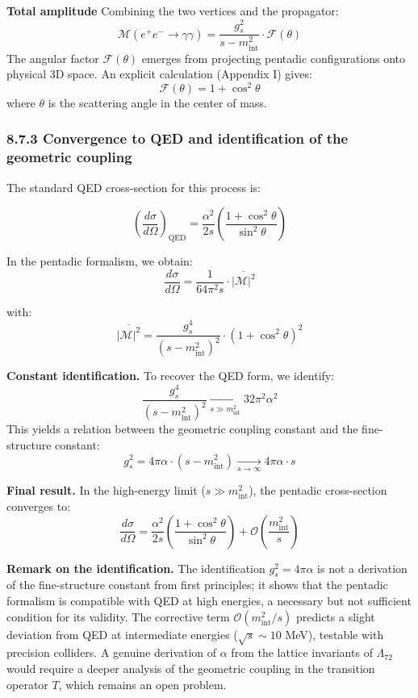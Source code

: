 \documentclass[11pt]{article}
\let\oldmathcal\mathcal
\renewcommand{\mathcal}[1]{\oldmathcal{#1}}
\begin{document}
\textbf{Total amplitude} Combining the two vertices and the propagator:
\[
\mathcal{M}(e^+ e^- \to \gamma\gamma) = \frac{g_s^2}{s - m_{\text{int}}^2} \cdot \mathcal{F}(\theta)
\] The angular factor \(\mathcal{F}(\theta)\) emerges from projecting
pentadic configurations onto physical 3D space. An explicit calculation
(Appendix I) gives: \[
\mathcal{F}(\theta) = 1 + \cos^2\theta
\] where \(\theta\) is the scattering angle in the center of mass.

\hypertarget{convergence-to-qed-and-identification-of-the-geometric-coupling}{%
\subsubsection{8.7.3 Convergence to QED and identification of the
geometric
coupling}\label{convergence-to-qed-and-identification-of-the-geometric-coupling}}

The standard QED cross-section for this process is:

\[
\left(\frac{d\sigma}{d\Omega}\right)_{\text{QED}} = \frac{\alpha^2}{2s} \left(\frac{1 + \cos^2\theta}{\sin^2\theta}\right)
\]

In the pentadic formalism, we obtain: \[
\frac{d\sigma}{d\Omega} = \frac{1}{64\pi^2 s} \cdot \overline{|\mathcal{M}|^2}
\]

with: \[
\overline{|\mathcal{M}|^2} = \frac{g_s^4}{(s - m_{\text{int}}^2)^2} \cdot (1 + \cos^2\theta)^2
\]

\noindent \textbf{Constant identification.} To recover the QED form, we
identify: \[
\frac{g_s^4}{(s - m_{\text{int}}^2)^2} \xrightarrow[s \gg m_{\text{int}}^2]{} 32\pi^2 \alpha^2
\] This yields a relation between the geometric coupling constant and
the fine-structure constant: \[
g_s^2 = 4\pi\alpha \cdot (s - m_{\text{int}}^2) \xrightarrow[s \to \infty]{} 4\pi\alpha \cdot s
\]

\noindent \textbf{Final result.} In the high-energy limit
(\(s \gg m_{\text{int}}^2\)), the pentadic cross-section converges to:
\[
\boxed{
\frac{d\sigma}{d\Omega} = \frac{\alpha^2}{2s} \left( \frac{1 + \cos^2\theta}{\sin^2\theta} \right) + \mathcal{O}\left( \frac{m_{\text{int}}^2}{s} \right)
}
\]

\noindent \textbf{Remark on the identification.} The identification
\(g_s^2 = 4\pi\alpha\) is not a derivation of the fine-structure
constant from first principles; it shows that the pentadic formalism is
compatible with QED at high energies, a necessary but not sufficient
condition for its validity. The corrective term
\(\mathcal{O}(m_{\text{int}}^2/s)\) predicts a slight deviation from QED
at intermediate energies (\(\sqrt{s} \sim 10\) MeV), testable with
precision colliders. A genuine derivation of \(\alpha\) from the lattice
invariants of \(\Lambda_{72}\) would require a deeper analysis of the
geometric coupling in the transition operator \(T\), which remains an
open problem.
\end{document}
